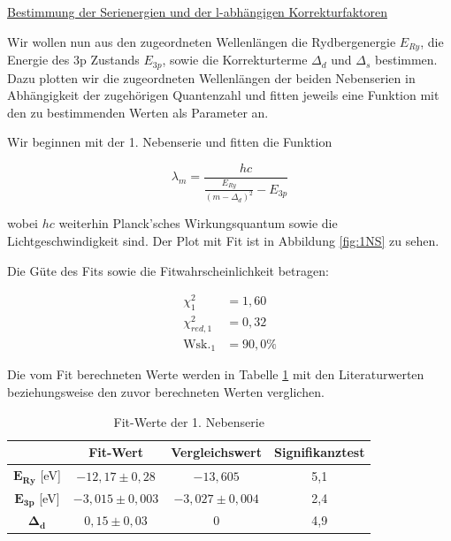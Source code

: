 \documentclass{article}
\begin{document}
\clearpage
\newpage

\underline{Bestimmung der Serienergien und der l-abhängigen Korrekturfaktoren}

Wir wollen nun aus den zugeordneten Wellenlängen die Rydbergenergie $E_{Ry}$, die Energie des 3p Zustands $E_{3p}$, sowie die Korrekturterme $\Delta_d$ und $\Delta_s$ bestimmen. Dazu plotten wir die zugeordneten Wellenlängen der beiden Nebenserien in Abhängigkeit der zugehörigen Quantenzahl und fitten jeweils eine Funktion mit den zu bestimmenden Werten als Parameter an.

Wir beginnen mit der 1. Nebenserie und fitten die Funktion

\begin{equation}
    \lambda_m = \frac{hc}{\frac{E_{Ry}}{(m - \Delta_d)^2} - E_{3p}}
\end{equation}

wobei $hc$ weiterhin Planck'sches Wirkungsquantum sowie die Lichtgeschwindigkeit sind. Der Plot mit Fit ist in Abbildung \ref{fig:1NS} zu sehen. 



Die Güte des Fits sowie die Fitwahrscheinlichkeit betragen:

\begin{equation}
    \begin{split}
        \chi^2_1 &= 1,60 \\
        \chi^2_{red,1} &= 0,32 \\
        \text{Wsk.}_1 &= 90,0 \%
    \end{split}
\end{equation}

Die vom Fit berechneten Werte werden in Tabelle \ref{tab:Fit1} mit den Literaturwerten beziehungsweise den zuvor berechneten Werten verglichen.

\phantom{.}

\begin{table}[!h]
    \centering
    \begin{tabular}{c|ccc}
        \hline
        \textbf{} & \textbf{Fit-Wert} & \textbf{Vergleichswert} & \textbf{Signifikanztest} \\ \hline
        $\mathbf{E_{Ry}}$ [eV] &     $-12,17 \pm 0,28$      &     $ -13,605 $      &     5,1      \\
        $\mathbf{E_{3p}}$ [eV] &     $-3,015 \pm 0,003$      &      $ -3,027 \pm 0,004 $     &    2,4       \\
        $\mathbf{\Delta_d}$ &      $0,15 \pm 0,03$     &     $ 0 $      &      4,9     \\ \hline
    \end{tabular}
    \caption{Fit-Werte der 1. Nebenserie}
    \label{tab:Fit1}
\end{table}
\end{document}
